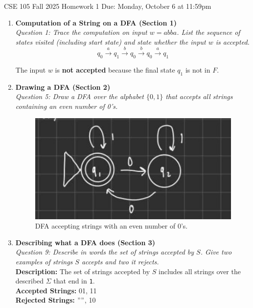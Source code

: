 \documentclass[10pt,letterpaper,unboxed,cm]{article}
\begin{document}
\hfill{CSE 105 Fall 2025}
\hfill{Homework 1}
\hfill{Due: Monday, October 6 at 11:59pm}

\begin{enumerate}

\item \textbf{Computation of a String on a DFA (Section 1)} \\
\emph{Question 1: Trace the computation on input $w = abba$. 
List the sequence of states visited (including start state) and state whether the input $w$ is accepted.} \\

\[
q_0 \xrightarrow{a} q_1 \xrightarrow{b} q_0 \xrightarrow{b} q_0 \xrightarrow{a} q_1
\]

The input $w$ is \textbf{not accepted} because the final state $q_1$ is not in $F$.

\item \textbf{Drawing a DFA (Section 2)} \\
\emph{Question 5: Draw a DFA over the alphabet $\{0,1\}$ that accepts all strings containing an even number of 0’s.}

\begin{figure}[h!]
    \centering
    \includegraphics[width=0.75\linewidth]{images/cse105q5.png}
    \caption{DFA accepting strings with an even number of 0’s.}
\end{figure}

\item \textbf{Describing what a DFA does (Section 3)} \\
\emph{Question 9: Describe in words the set of strings accepted by $S$.
Give two examples of strings $S$ accepts and two it rejects.} \\

\textbf{Description:} The set of strings accepted by $S$ includes all strings over the described $\Sigma$ that end in \texttt{1}. \\[0.5em]
\textbf{Accepted Strings:} 01, 11 \\
\textbf{Rejected Strings:} $" "$, 10


\end{enumerate}
\end{document}
